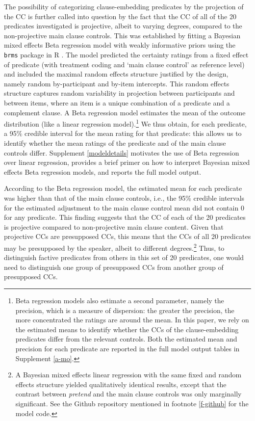 \documentclass[11pt,fleqn]{article}
\newcommand{\6}{\mbox{$[\hspace*{-.6mm}[$}}
\newcommand{\9}{\mbox{$]\hspace*{-.6mm}]$}}
\begin{document}
The possibility of categorizing clause-embedding predicates by the projection of the CC is further called into question by the fact that the CC of all of the 20 predicates investigated is projective, albeit to varying degrees, compared to the non-projective main clause controls. This was established by fitting a Bayesian mixed effects Beta regression model  with weakly informative priors using the \verb|brms| \citep{buerkner2017}  package in R \citep{R}. The model predicted the certainty ratings from a fixed effect of predicate (with treatment coding and `main clause control' as  reference level) and included the maximal random effects structure justified by the design, namely random by-participant and by-item intercepts. This random effects structure captures random variability in projection between participants and between items, where an item is a unique combination of a predicate and a complement clause. A Beta regression model estimates the mean of the outcome distribution (like a linear regression model).\footnote{Beta regression models also estimate a second parameter, namely the precision, which is a measure of dispersion: the greater the precision, the more concentrated the ratings are around the mean. In this paper, we rely on the estimated means to identify whether the CCs of the clause-embedding predicates differ from the relevant controls. Both the estimated mean and precision for each predicate are reported in the full model output tables in Supplement \ref{a-mo}.} We thus obtain, for each predicate, a 95\% credible interval for the mean rating for that predicate: this allows us to identify whether the mean ratings of the predicate and of the main clause controls differ. Supplement \ref{modeldetails} motivates the use of Beta regression over linear regression, provides a brief primer on how to interpret Bayesian mixed effects Beta regression models, and reports the full model output.

According to the Beta regression model, the estimated mean for each predicate was higher than that of the main clause controls, i.e., the 95\% credible intervals for the estimated adjustment to the main clause control mean did not contain 0 for any predicate. This finding suggests that the CC of each of the 20 predicates is projective compared to non-projective main clause content. Given that projective CCs are presupposed CCs, this means that the CCs of all 20 predicates may be presupposed by the speaker, albeit to different degrees.\footnote{A Bayesian mixed effects linear regression with the same fixed and random effects structure yielded qualitatively identical results, except that the contrast between \emph{pretend} and the main clause controls was only marginally significant. See the Github repository mentioned in footnote \ref{f-github} for the model code.} Thus, to distinguish factive predicates from others in this set of 20 predicates, one would need to distinguish one group of  presupposed CCs from another group of presupposed CCs.
\end{document}
